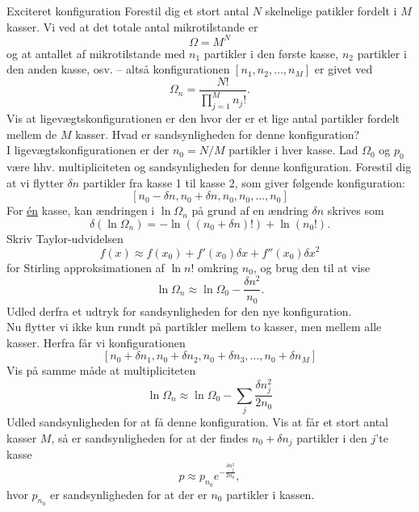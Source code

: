 \begin{opgave}{Exciteret konfiguration}
    Forestil dig et stort antal $N$ skelnelige patikler fordelt i $M$ kasser. Vi ved at det totale antal mikrotilstande er
    \[ \Omega=M^N \]
    og at antallet af mikrotilstande med $n_1$ partikler i den første kasse, $n_2$ partikler i den anden kasse, osv. -- altså konfigurationen $[n_1,n_2,\dots,n_M]$ er givet ved
    \[ \Omega_n=\frac{N!}{\prod_{j=1}^M n_j!}. \]
    \opg Vis at ligevægtskonfigurationen er den hvor der er et lige antal partikler fordelt mellem de $M$ kasser.
    \opg Hvad er sandsynligheden for denne konfiguration?\\[12pt]
    I ligevægtskonfigurationen er der $n_0=N/M$ partikler i hver kasse. Lad $\Omega_0$ og $p_0$ være hhv. multipliciteten og sandsynligheden for denne konfiguration. Forestil dig at vi flytter $\delta n$ partikler fra kasse 1 til kasse 2, som giver følgende konfiguration:
    \[ [n_0-\delta n,n_0+\delta n,n_0,n_0,\dots,n_0] \]
    \opg For \underline{én} kasse, kan ændringen i $\ln\Omega_n$ på grund af en ændring $\delta n$ skrives som
    \[ \delta(\ln\Omega_n)=-\ln\left((n_0+\delta n)!\right)+\ln(n_0!). \]
    Skriv Taylor-udvidelsen
    \[ f(x)\approx f(x_0)+f'(x_0)\delta x+f''(x_0)\delta x^2 \]
    for Stirling approksimationen af $\ln n!$ omkring $n_0$, og brug den til at vise 
    \[ \ln\Omega_n\approx \ln\Omega_0-\frac{\delta n^2}{n_0}. \]
    \opg Udled derfra et udtryk for sandsynligheden for den nye konfiguration.\\[12pt]
    Nu flytter vi ikke kun rundt på partikler mellem to kasser, men mellem alle kasser. Herfra får vi konfigurationen
    \[ [n_0+\delta n_1,n_0+\delta n_2,n_0+\delta n_3,\dots,n_0+\delta n_M] \]
    \opg Vis på samme måde at multipliciteten
    \[ \ln\Omega_n\approx \ln\Omega_0-\sum_j\frac{\delta n_j^2}{2n_0} \]
    \opg Udled sandsynligheden for at få denne konfiguration.
    \opg Vis at får et stort antal kasser $M$, så er sandsynligheden for at der findes $n_0+\delta n_j$ partikler i den $j$'te kasse
    \[ p\approx p_{n_0}e^{-\frac{\delta n_j^2}{2n_0}}, \]
    hvor $p_{n_0}$ er sandsynligheden for at der er $n_0$ partikler i kassen.
\end{opgave}

